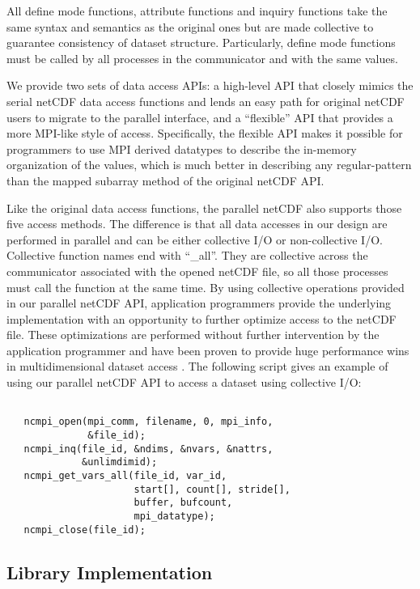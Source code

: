 \documentclass[10pt,twocolumn]{article}          %
\begin{document}
All define mode functions, attribute functions and inquiry
functions take the same syntax and semantics as the original ones
but are made collective to guarantee consistency of dataset
structure. Particularly, define mode functions must be called by
all processes in the communicator and with the same values.

We provide two sets of data access APIs: a high-level API that closely mimics the serial netCDF
data access functions and lends an easy path for original netCDF users to migrate to the parallel
interface, and a ``flexible'' API that provides a more MPI-like style of access. Specifically, the
flexible API makes it possible for programmers to use MPI derived datatypes to describe the
in-memory organization of the values, which is much better in describing any regular-pattern than
the mapped subarray method of the original netCDF API.

Like the original data access functions, the parallel netCDF also supports those five access
methods. The difference is that all data accesses in our design are performed in parallel and can
be either collective I/O or non-collective I/O. Collective function names end with ``\_all''. They
are collective across the communicator associated with the opened netCDF file, so all those
processes must call the function at the same time. By using collective operations provided in our
parallel netCDF API, application programmers provide the underlying implementation with an
opportunity to further optimize access to the netCDF file. These optimizations are performed
without further intervention by the application programmer and have been proven to provide huge
performance wins in multidimensional dataset access \cite{ThGL99}. The following script gives an
example of using our parallel netCDF API to access a dataset using collective I/O:

{\scriptsize \setlength{\parskip}{-0.3pc}

\begin{verbatim}

   ncmpi_open(mpi_comm, filename, 0, mpi_info,
              &file_id);
   ncmpi_inq(file_id, &ndims, &nvars, &nattrs,
             &unlimdimid);
   ncmpi_get_vars_all(file_id, var_id,
                      start[], count[], stride[],
                      buffer, bufcount,
                      mpi_datatype);
   ncmpi_close(file_id);

\end{verbatim}
}

\subsection{Library Implementation}
\end{document}
